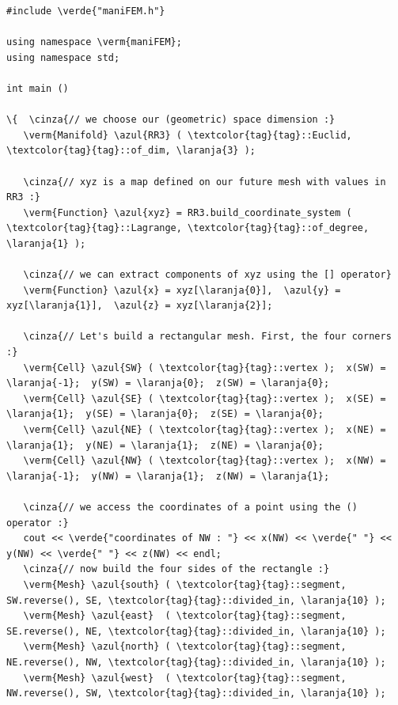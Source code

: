 \begin{Verbatim}[commandchars=\\\{\},formatcom=\small\tt,frame=single,
   label=parag-\ref{\numb section 1.\numb parag 1}.cpp,rulecolor=\color{coment},
   baselinestretch=0.94,framesep=2mm                                            ]
#include \verde{"maniFEM.h"}

using namespace \verm{maniFEM};
using namespace std;

int main ()

\{  \cinza{// we choose our (geometric) space dimension :}
   \verm{Manifold} \azul{RR3} ( \textcolor{tag}{tag}::Euclid, \textcolor{tag}{tag}::of_dim, \laranja{3} );
   
   \cinza{// xyz is a map defined on our future mesh with values in RR3 :}
   \verm{Function} \azul{xyz} = RR3.build_coordinate_system ( \textcolor{tag}{tag}::Lagrange, \textcolor{tag}{tag}::of_degree, \laranja{1} );

   \cinza{// we can extract components of xyz using the [] operator}
   \verm{Function} \azul{x} = xyz[\laranja{0}],  \azul{y} = xyz[\laranja{1}],  \azul{z} = xyz[\laranja{2}];

   \cinza{// Let's build a rectangular mesh. First, the four corners :}
   \verm{Cell} \azul{SW} ( \textcolor{tag}{tag}::vertex );  x(SW) = \laranja{-1};  y(SW) = \laranja{0};  z(SW) = \laranja{0};
   \verm{Cell} \azul{SE} ( \textcolor{tag}{tag}::vertex );  x(SE) =  \laranja{1};  y(SE) = \laranja{0};  z(SE) = \laranja{0};
   \verm{Cell} \azul{NE} ( \textcolor{tag}{tag}::vertex );  x(NE) =  \laranja{1};  y(NE) = \laranja{1};  z(NE) = \laranja{0};
   \verm{Cell} \azul{NW} ( \textcolor{tag}{tag}::vertex );  x(NW) = \laranja{-1};  y(NW) = \laranja{1};  z(NW) = \laranja{1};
   
   \cinza{// we access the coordinates of a point using the () operator :}								
   cout << \verde{"coordinates of NW : "} << x(NW) << \verde{" "} << y(NW) << \verde{" "} << z(NW) << endl;
   \cinza{// now build the four sides of the rectangle :}
   \verm{Mesh} \azul{south} ( \textcolor{tag}{tag}::segment, SW.reverse(), SE, \textcolor{tag}{tag}::divided_in, \laranja{10} );
   \verm{Mesh} \azul{east}  ( \textcolor{tag}{tag}::segment, SE.reverse(), NE, \textcolor{tag}{tag}::divided_in, \laranja{10} );
   \verm{Mesh} \azul{north} ( \textcolor{tag}{tag}::segment, NE.reverse(), NW, \textcolor{tag}{tag}::divided_in, \laranja{10} );
   \verm{Mesh} \azul{west}  ( \textcolor{tag}{tag}::segment, NW.reverse(), SW, \textcolor{tag}{tag}::divided_in, \laranja{10} );
   

\end{Verbatim}
